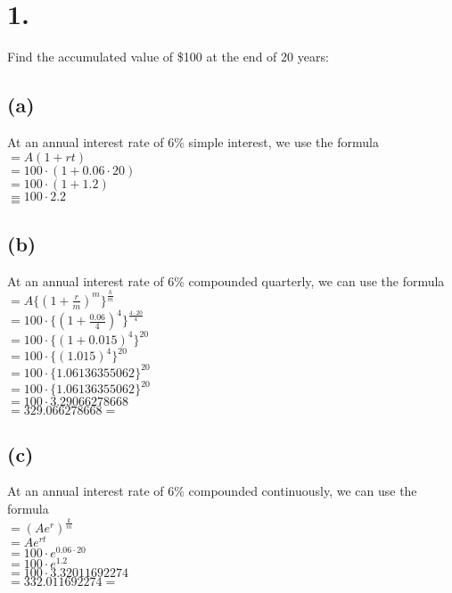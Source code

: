 \documentclass{article}
\begin{document}
\thispagestyle{firstpageheader}

\section*{1.}
{\Large 

Find the accumulated value of \$100 at the end of 20 years:

\subsection*{(a)}

At an annual interest rate of 6\% simple interest, we use the formula \\
$= A(1 + rt)$ \\
$= 100 \cdot (1 + 0.06 \cdot 20)$ \\ 
$= 100 \cdot (1 + 1.2)$ \\
$= 100 \cdot 2.2$ \\ 
$= $ 

\subsection*{(b)}

At an annual interest rate of 6\% compounded quarterly, we can use the formula \\
$= A \{(1 + \frac{r}{m})^m\}^{\frac{k}{m}}$ \\
$= 100 \cdot \{(1 + \frac{0.06}{4})^4\}^{\frac{4 \cdot 20}{4}}$ \\
$= 100 \cdot \{(1 + 0.015)^4\}^{20}$ \\
$= 100 \cdot \{(1.015)^4\}^{20}$ \\
$= 100 \cdot \{1.06136355062\}^{20}$ \\
$= 100 \cdot \{1.06136355062\}^{20}$ \\
$= 100 \cdot 3.29066278668 $ \\
$= 329.066278668 = $ 

\subsection*{(c)}

At an annual interest rate of 6\% compounded continuously, we can use the formula \\
$= (Ae^{r})^{\frac{k}{m}} $ \\
$= Ae^{rt} $ \\
$= 100 \cdot e^{0.06 \cdot 20} $ \\
$= 100 \cdot e^{1.2} $ \\
$= 100 \cdot 3.32011692274 $ \\
$= 332.011692274  = $ 

}
\end{document}
